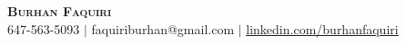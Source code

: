 \begin{center}
    \textbf{\Huge \scshape Burhan Faquiri} \\ \vspace{1pt}
    \small 647-563-5093 $|$ {faquiriburhan@gmail.com} $|$ 
    \href{https://www.linkedin.com/in/burhanfaquiri/}{\underline{linkedin.com/burhanfaquiri}} 
\end{center}